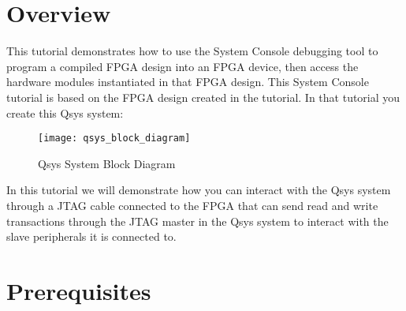 \tableofcontents

\section*{Overview}

\begin{flushleft}
\noindent
This tutorial demonstrates how to use the System Console debugging tool to program a compiled FPGA design into an FPGA device, then access the hardware modules instantiated in that FPGA design.  This System Console tutorial is based on the FPGA design created in the  tutorial.  In that tutorial you create this Qsys system:

\begin{figure}[H]
\centering
\texttt{[image: qsys\_block\_diagram]}
\caption{Qsys System Block Diagram}
\label{fig:qsys_block_diagram}
\end{figure}

In this tutorial we will demonstrate how you can interact with the Qsys system through a JTAG cable connected to the FPGA that can send read and write transactions through the JTAG master in the Qsys system to interact with the slave peripherals it is connected to.

\end{flushleft}

\section*{Prerequisites}


